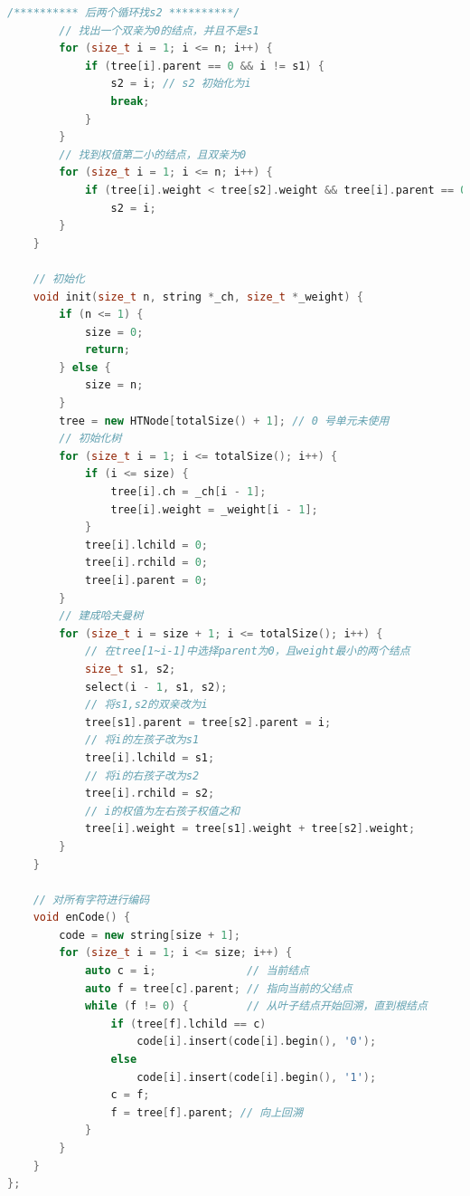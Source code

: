 \documentclass{ctexart}
\begin{document}
\begin{lstlisting}[language=C++,caption=HTNode类的实现,label=code2]
        /********** 后两个循环找s2 **********/
        // 找出一个双亲为0的结点，并且不是s1
        for (size_t i = 1; i <= n; i++) {
            if (tree[i].parent == 0 && i != s1) {
                s2 = i; // s2 初始化为i
                break;
            }
        }
        // 找到权值第二小的结点，且双亲为0
        for (size_t i = 1; i <= n; i++) {
            if (tree[i].weight < tree[s2].weight && tree[i].parent == 0 && i != s1)
                s2 = i;
        }
    }

    // 初始化
    void init(size_t n, string *_ch, size_t *_weight) {
        if (n <= 1) {
            size = 0;
            return;
        } else {
            size = n;
        }
        tree = new HTNode[totalSize() + 1]; // 0 号单元未使用
        // 初始化树
        for (size_t i = 1; i <= totalSize(); i++) {
            if (i <= size) {
                tree[i].ch = _ch[i - 1];
                tree[i].weight = _weight[i - 1];
            }
            tree[i].lchild = 0;
            tree[i].rchild = 0;
            tree[i].parent = 0;
        }
        // 建成哈夫曼树
        for (size_t i = size + 1; i <= totalSize(); i++) {
            // 在tree[1~i-1]中选择parent为0，且weight最小的两个结点
            size_t s1, s2;
            select(i - 1, s1, s2);
            // 将s1,s2的双亲改为i
            tree[s1].parent = tree[s2].parent = i;
            // 将i的左孩子改为s1
            tree[i].lchild = s1;
            // 将i的右孩子改为s2
            tree[i].rchild = s2;
            // i的权值为左右孩子权值之和
            tree[i].weight = tree[s1].weight + tree[s2].weight;
        }
    }

    // 对所有字符进行编码
    void enCode() {
        code = new string[size + 1];
        for (size_t i = 1; i <= size; i++) {
            auto c = i;              // 当前结点
            auto f = tree[c].parent; // 指向当前的父结点
            while (f != 0) {         // 从叶子结点开始回溯，直到根结点
                if (tree[f].lchild == c)
                    code[i].insert(code[i].begin(), '0');
                else
                    code[i].insert(code[i].begin(), '1');
                c = f;
                f = tree[f].parent; // 向上回溯
            }
        }
    }
};
\end{lstlisting}
\end{document}
